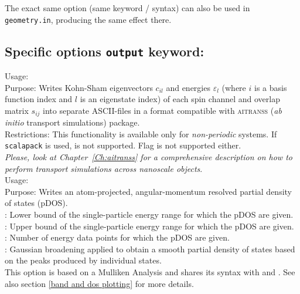 The exact same option (same keyword / syntax) can also be used in
\texttt{geometry.in}, producing the same effect there.

\newpage

\subsection*{Specific options \texttt{output} keyword:}

{
  \noindent
  Usage:   \\[1.0ex]
  Purpose: Writes Kohn-Sham eigenvectors $c_{il}$ and energies $\varepsilon_l$ 
    (where $i$ is a basis function index and $l$ is an eigenstate index) of each 
    spin channel and overlap matrix $s_{ij}$ into separate ASCII-files in a 
    format compatible with \textsc{aitranss} (\textit{ab initio} transport 
    simulations) package. \\[1.0ex] 
  Restrictions: This functionality is available only for 
    \emph{non-periodic} systems. If  \texttt{scalapack} is 
    used,  is not supported. Flag 
     is not supported either.\\
}
\emph{Please, look at Chapter~\ref{Ch:aitranss} for 
  a comprehensive description on how to perform transport simulations across 
  nanoscale objects}. \\


{
  Usage:  
   \\[1.0ex]
  Purpose: Writes an atom-projected, angular-momentum resolved partial
    density of states (pDOS). \\[1.0ex]
   : Lower bound of the single-particle energy range
    for which the pDOS are given. \\
   : Upper bound of the single-particle energy range
    for which the pDOS are given. \\
   : Number of energy data points for which the
    pDOS are given. \\
   : Gaussian broadening applied to obtain a smooth
    partial density of states based on the peaks produced by
    individual states. \\
} 
This option is based on a Mulliken Analysis and shares its syntax with 
  and 
. See also section \ref{band
and dos plotting} for more details.  

